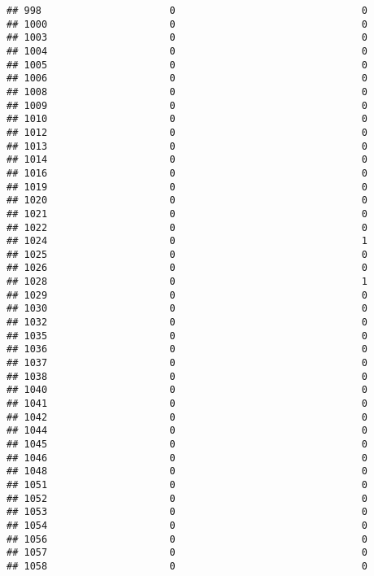 \documentclass[
]{article}
\begin{document}
\begin{verbatim}
## 998                      0                                0
## 1000                     0                                0
## 1003                     0                                0
## 1004                     0                                0
## 1005                     0                                0
## 1006                     0                                0
## 1008                     0                                0
## 1009                     0                                0
## 1010                     0                                0
## 1012                     0                                0
## 1013                     0                                0
## 1014                     0                                0
## 1016                     0                                0
## 1019                     0                                0
## 1020                     0                                0
## 1021                     0                                0
## 1022                     0                                0
## 1024                     0                                1
## 1025                     0                                0
## 1026                     0                                0
## 1028                     0                                1
## 1029                     0                                0
## 1030                     0                                0
## 1032                     0                                0
## 1035                     0                                0
## 1036                     0                                0
## 1037                     0                                0
## 1038                     0                                0
## 1040                     0                                0
## 1041                     0                                0
## 1042                     0                                0
## 1044                     0                                0
## 1045                     0                                0
## 1046                     0                                0
## 1048                     0                                0
## 1051                     0                                0
## 1052                     0                                0
## 1053                     0                                0
## 1054                     0                                0
## 1056                     0                                0
## 1057                     0                                0
## 1058                     0                                0

\end{verbatim}
\end{document}
